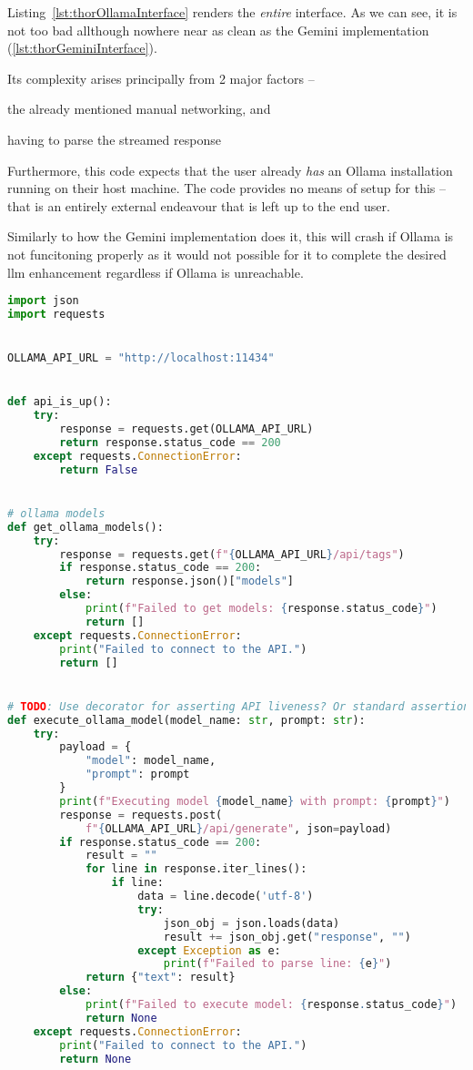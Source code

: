  Listing~\ref{lst:thorOllamaInterface} renders the
\emph{entire} interface. As we can see, it is not too bad allthough nowhere near
as clean as the Gemini implementation (\ref{lst:thorGeminiInterface}).

Its complexity arises principally from \num{2} major factors --
\begin{inparaenum}
    \item the already mentioned manual networking, and 
    \item having to parse the streamed response
\end{inparaenum}
Furthermore, this code expects that the user already \emph{has} an Ollama
installation running on their host machine. The code provides no means of setup
for this -- that is an entirely external endeavour that is left up to the end user.

Similarly to how the Gemini implementation does it, this will crash if Ollama is
not funcitoning properly as it would not possible for it to complete the desired
\acrshort{llm} enhancement regardless if Ollama is unreachable.

\begin{lstlisting}[caption={llm\_api\_interfaces/ollama.py, The implementation of an Ollama interface for executing prompts.}, label={lst:thorOllamaInterface}, language={Python}]
import json
import requests


OLLAMA_API_URL = "http://localhost:11434"


def api_is_up():
    try:
        response = requests.get(OLLAMA_API_URL)
        return response.status_code == 200
    except requests.ConnectionError:
        return False


# ollama models
def get_ollama_models():
    try:
        response = requests.get(f"{OLLAMA_API_URL}/api/tags")
        if response.status_code == 200:
            return response.json()["models"]
        else:
            print(f"Failed to get models: {response.status_code}")
            return []
    except requests.ConnectionError:
        print("Failed to connect to the API.")
        return []


# TODO: Use decorator for asserting API liveness? Or standard assertion??
def execute_ollama_model(model_name: str, prompt: str):
    try:
        payload = {
            "model": model_name,
            "prompt": prompt
        }
        print(f"Executing model {model_name} with prompt: {prompt}")
        response = requests.post(
            f"{OLLAMA_API_URL}/api/generate", json=payload)
        if response.status_code == 200:
            result = ""
            for line in response.iter_lines():
                if line:
                    data = line.decode('utf-8')
                    try:
                        json_obj = json.loads(data)
                        result += json_obj.get("response", "")
                    except Exception as e:
                        print(f"Failed to parse line: {e}")
            return {"text": result}
        else:
            print(f"Failed to execute model: {response.status_code}")
            return None
    except requests.ConnectionError:
        print("Failed to connect to the API.")
        return None
\end{lstlisting}

